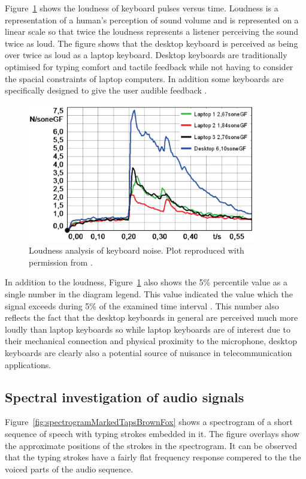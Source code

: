 Figure~\ref{fig:TypingLoudnessKeyboards} shows the loudness of keyboard pulses versus time. Loudness is a representation of a human's perception of sound volume and is represented on a linear scale so that twice the loudness represents a listener perceiving the sound twice as loud. The figure shows that the desktop keyboard is perceived as being over twice as loud as a laptop keyboard. Desktop keyboards are traditionally optimised for typing comfort and tactile feedback while not having to consider the spacial constraints of laptop computers. In addition some keyboards are specifically designed to give the user audible feedback \cite{Hauswirth2013}.

\begin{figure}[!] %
\centering
\includegraphics[width=100mm]{TypingLoudnessKeyboards.png}
\caption{Loudness analysis of keyboard noise. Plot reproduced with permission from \cite{Hauswirth2013}.}\label{fig:TypingLoudnessKeyboards}
\end{figure}

In addition to the loudness, Figure~\ref{fig:TypingLoudnessKeyboards} also shows the 5\% percentile value as a single number in the diagram legend. This value indicated the value which the signal exceeds during 5\% of the examined time interval \cite{Hauswirth2013}. This number also reflects the fact that the desktop keyboards in general are perceived much more loudly than laptop keyboards so while laptop keyboards are of interest due to their mechanical connection and physical proximity to the microphone, desktop keyboards are clearly also a potential source of nuisance in telecommunication applications.

\subsection{Spectral investigation of audio signals}
Figure~\ref{fig:spectrogramMarkedTapsBrownFox} shows a spectrogram of a short sequence of speech with typing strokes embedded in it. The figure overlays show the approximate positions of the strokes in the spectrogram. It can be observed that the typing strokes have a fairly flat frequency response compered to the the voiced parts of the audio sequence.

